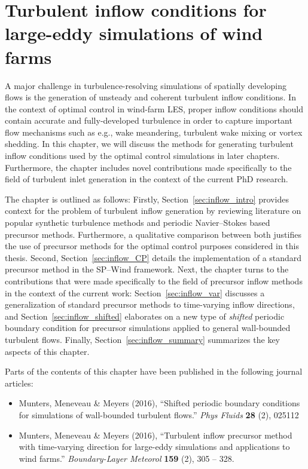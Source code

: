 \chapter{Turbulent inflow conditions for large-eddy simulations of wind farms}\label{ch:turbulent_inflow}
A major challenge in turbulence-resolving simulations of spatially developing flows is the generation of unsteady and coherent turbulent inflow conditions. In the context of optimal control in wind-farm LES, proper inflow conditions should contain accurate and fully-developed turbulence in order to capture important flow mechanisms such as e.g., wake meandering, turbulent wake mixing or vortex shedding. In this chapter, we will discuss the methods for generating turbulent inflow conditions used by the optimal control simulations in later chapters. Furthermore, the chapter includes novel contributions made specifically to the field of turbulent inlet generation in the context of the current PhD research. 

The chapter is outlined as follows: Firstly, Section~\ref{sec:inflow_intro} provides context for the problem of turbulent inflow generation by reviewing literature on popular synthetic turbulence
methods and periodic Navier--Stokes based precursor methods. Furthermore, a qualitative comparison between both justifies the use of precursor methods for the optimal control purposes considered in
this thesis. Second, Section~\ref{sec:inflow_CP} details the implementation of a standard precursor method in the SP--Wind framework. Next, the chapter turns to the contributions that were made
specifically to the field of precursor inflow methods in the context of the current work: Section~\ref{sec:inflow_var} discusses a generalization of standard precursor methods to time-varying inflow
directions, and Section~\ref{sec:inflow_shifted} elaborates on a new type of \emph{shifted} periodic boundary condition for precursor simulations applied to general wall-bounded turbulent flows.
Finally, Section~\ref{sec:inflow_summary} summarizes the key aspects of this chapter. 

Parts of the contents of this chapter have been published in the following journal articles:
\begin{itemize}
	\item Munters, Meneveau \& Meyers (2016), ``Shifted periodic boundary conditions for simulations of wall-bounded turbulent flows.'' \emph{Phys Fluids} \textbf{28} (2), 025112
	\item Munters, Meneveau \& Meyers (2016), ``Turbulent inflow precursor method with time-varying direction for large-eddy simulations and applications to wind farms.'' \emph{Boundary-Layer Meteorol} \textbf{159} (2), 305 -- 328. 
\end{itemize} 

